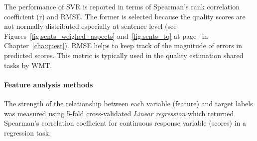 The performance of \gls{SVR} is reported in terms of Spearman's rank correlation coefficient (r) and \gls{RMSE}. The former is selected because the quality scores are not normally distributed especially at sentence level (see Figures~\ref{fig:sents_weighed_aspects} and~\ref{fig:sents_tq} at page~\pageref{pg:skews} in Chapter~\ref{cha:quest}). \gls{RMSE} helps to keep track of the magnitude of errors in predicted scores. This metric is typically used in the quality estimation shared tasks by \gls{WMT}.

\paragraph{Feature analysis methods}
The strength of the relationship between each variable (feature) and target labels was measured using 5-fold cross-validated \textit{Linear regression} which returned Spearman's correlation coefficient for continuous response variable (scores) in a regression task. 







